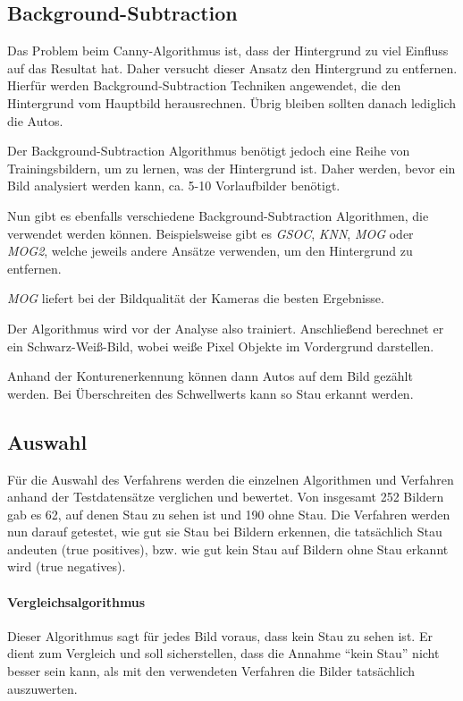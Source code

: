 \subsection{Background-Subtraction}
Das Problem beim Canny-Algorithmus ist, dass der Hintergrund zu viel Einfluss auf das Resultat hat.
Daher versucht dieser Ansatz den Hintergrund zu entfernen. Hierfür werden Background-Subtraction Techniken angewendet, die den Hintergrund
vom Hauptbild herausrechnen. Übrig bleiben sollten danach lediglich die Autos.

Der Background-Subtraction Algorithmus benötigt jedoch eine Reihe von Trainingsbildern, um zu lernen, was der Hintergrund ist.
Daher werden, bevor ein Bild analysiert werden kann, ca. 5-10 Vorlaufbilder benötigt.

Nun gibt es ebenfalls verschiedene Background-Subtraction Algorithmen, die verwendet werden können. Beispielsweise gibt es {\em GSOC}, {\em KNN}, {\em MOG} oder {\em MOG2}, welche jeweils andere Ansätze verwenden, um den Hintergrund zu entfernen.

{\em MOG} liefert bei der Bildqualität der Kameras die besten Ergebnisse.

Der Algorithmus wird vor der Analyse also trainiert. Anschließend berechnet er ein Schwarz-Weiß-Bild, wobei weiße Pixel Objekte im Vordergrund darstellen.

Anhand der Konturenerkennung können dann Autos auf dem Bild gezählt werden. Bei Überschreiten des Schwellwerts kann so Stau erkannt werden.

\subsection{Auswahl}
Für die Auswahl des Verfahrens werden die einzelnen Algorithmen und Verfahren anhand der Testdatensätze verglichen und bewertet.
Von insgesamt 252 Bildern gab es 62, auf denen Stau zu sehen ist und 190 ohne Stau.
Die Verfahren werden nun darauf getestet, wie gut sie Stau bei Bildern erkennen, die tatsächlich Stau andeuten (true positives), bzw. wie gut kein Stau auf Bildern ohne Stau erkannt wird (true negatives).

\paragraph{Vergleichsalgorithmus}
Dieser Algorithmus sagt für jedes Bild voraus, dass kein Stau zu sehen ist. Er dient zum Vergleich und soll sicherstellen, dass die Annahme "`kein Stau"' nicht besser sein kann, als mit den verwendeten Verfahren die Bilder tatsächlich auszuwerten.

